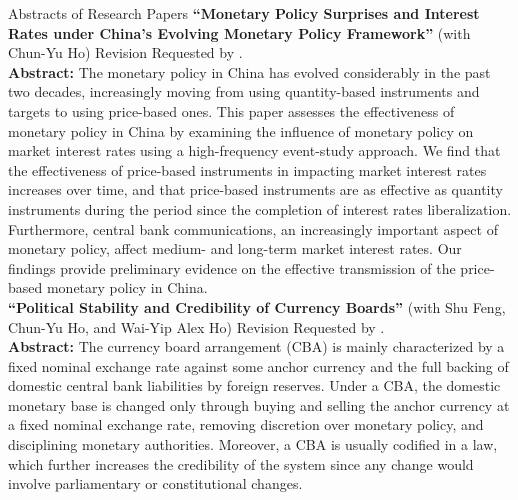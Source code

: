 \documentclass{resume_liang} %
\begin{document}
\newpage
\begin{rSection}{Abstracts of Research Papers}
	\textbf{``Monetary Policy Surprises and Interest Rates under China's Evolving Monetary Policy Framework''} (with Chun-Yu Ho) Revision Requested by \textit{}.\vspace{0.1cm}\\ 
	\textbf{Abstract:} The monetary policy in China has evolved considerably in the past two decades, increasingly moving from using quantity-based instruments and targets to using price-based ones. This paper assesses the effectiveness of monetary policy in China by examining the influence of monetary policy on market interest rates using a high-frequency event-study approach. We find that the effectiveness of price-based instruments in impacting market interest rates increases over time, and that price-based instruments are as effective as quantity instruments during the period since the completion of interest rates liberalization. Furthermore, central bank communications, an increasingly important aspect of monetary policy, affect medium- and long-term market interest rates. Our findings provide preliminary evidence on the effective transmission of the price-based monetary policy in China. \\
	
	\textbf{``Political Stability and Credibility of Currency Boards''} (with Shu Feng, Chun-Yu Ho, and Wai-Yip Alex Ho) Revision Requested by \textit{}.\vspace{0.1cm}\\
	\textbf{Abstract:} The currency board arrangement (CBA) is mainly characterized by a fixed nominal exchange rate against some anchor currency and the full backing of domestic central bank liabilities by foreign reserves. Under a CBA, the domestic monetary base is changed only through buying and selling the anchor currency at a fixed nominal exchange rate, removing discretion over monetary policy, and disciplining monetary authorities. Moreover, a CBA is usually codified in a law, which further increases the credibility of the system since any change would involve parliamentary or constitutional changes.  
	

\end{rSection}
\end{document}
